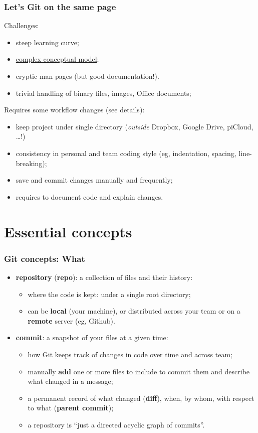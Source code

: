 \documentclass[10pt,svgnames,handout]{beamer}
\begin{document}
\begin{frame}
\frametitle{Let's Git on the same page}
\label{git_cons}

Challenges:
\begin{itemize}
  \item steep learning curve;
  \item \hyperlink{xkcd_git}{complex conceptual model};
  \item cryptic man pages (but good documentation!).
  \item trivial handling of binary files, images, Office documents;
\end{itemize}

\medskip

Requires some workflow changes (\hypertarget{style}{see details}):
\begin{itemize}
  \item keep project under single directory (\emph{outside} Dropbox, Google Drive, piCloud, \ldots!)
  \item consistency in personal and team coding style (eg, indentation, spacing, line-breaking);
  \item save and commit changes manually and frequently;
  \item requires to document code and explain changes.
\end{itemize}
\end{frame}


\section{Essential concepts}
\begin{frame}
\frametitle{Git concepts: What}
    
\begin{itemize}[<+->]
\item \textbf{repository} (\textbf{repo}): a collection of files and their history:
\begin{itemize}
   \item where the code is kept: under a single root directory;
   \item can be \textbf{local} (your machine), or distributed across your team or on a \textbf{remote} server (eg, Github).
 \end{itemize}

\item \textbf{commit}: a snapshot of your files at a given time:
\begin{itemize}
  \item how Git keeps track of changes in code over time and across team;
  \item manually \textbf{add} one or more files to include to commit them and describe what changed in a message;
  \item a permanent record of what changed (\textbf{diff}), when, by whom, with respect to what (\textbf{parent commit});
  \item a repository is “just a directed acyclic graph of commits”.
\end{itemize}
\end{itemize}
\end{frame}
\end{document}
